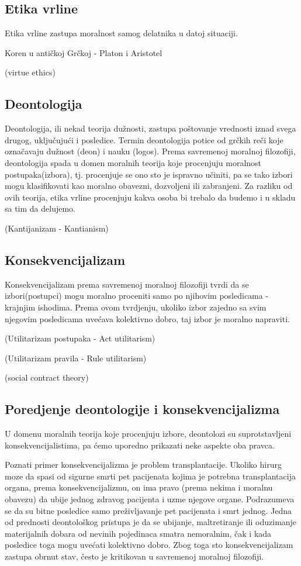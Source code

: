 \documentclass[a4paper]{article}
\begin{document}
\subsection{Etika vrline}

Etika vrline zastupa moralnost samog delatnika u datoj situaciji. 

Koren u antičkoj Grčkoj - Platon i Aristotel

(virtue ethics)

\subsection{Deontologija}
Deontologija, ili nekad teorija dužnosti, zastupa poštovanje vrednosti iznad svega drugog, uključujući i posledice. 
Termin deontologija potice od grčkih reči koje označavaju dužnost (deon) i nauku (logos). Prema savremenoj moralnoj filozofiji, deontologija spada u domen moralnih teorija koje procenjuju moralnost postupaka(izbora), tj. procenjuje se ono sto je ispravno učiniti, pa se tako izbori mogu klasifikovati kao moralno obavezni, dozvoljeni ili zabranjeni. Za razliku od ovih teorija, etika vrline procenjuju kakva osoba bi trebalo da budemo i u skladu sa tim da delujemo. 

(Kantijanizam - Kantianism)

\subsection{Konsekvencijalizam}
Konsekvencijalizam prema savremenoj moralnoj filozofiji tvrdi da se izbori(postupci) mogu moralno proceniti samo po njihovim posledicama - krajnjim ishodima. Prema ovom tvrdjenju, ukoliko izbor zajedno sa svim njegovim posledicama uvećava kolektivno dobro, taj izbor je moralno napraviti.

(Utilitarizam postupaka - Act utilitarism)

(Utilitarizam pravila - Rule utilitarism)

(social contract theory)

\subsection{Poredjenje deontologije i konsekvencijalizma}
U domenu moralnih teorija koje procenjuju izbore, deontolozi su suprotstavljeni konsekvencijalistima, pa ćemo uporedno prikazati neke aspekte oba pravca.

Poznati primer konsekvencijalizma je problem transplantacije. Ukoliko hirurg moze da spasi od sigurne smrti pet pacijenata kojima je potrebna transplantacija organa, prema konsekvencijalizmu, on ima pravo (prema nekima i moralnu obavezu) da ubije jednog zdravog pacijenta i uzme njegove organe. Podrazumeva se da su bitne posledice samo preživljavanje pet pacijenata i smrt jednog.
Jedna od prednosti deontološkog pristupa je da se ubijanje, maltretiranje ili oduzimanje materijalnih dobara od nevinih pojedinaca smatra nemoralnim, čak i kada posledice toga mogu uvećati kolektivno dobro. Zbog toga sto konsekvencijalizam zastupa obrnut stav, često je kritikovan u savremenoj moralnoj filozofiji.
\end{document}

